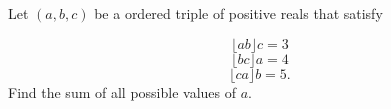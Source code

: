 Let $(a,b,c)$ be a ordered triple of positive reals that satisfy

$$\lfloor ab\rfloor c=3$$$$\lfloor bc\rfloor a=4$$$$\lfloor ca\rfloor b=5.$$Find the sum of all possible values of $a$.
